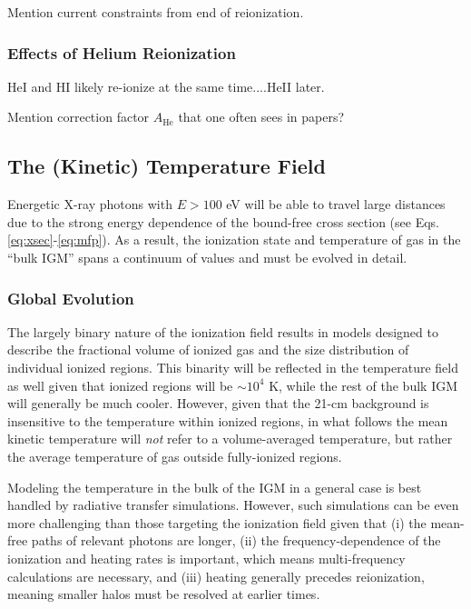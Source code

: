 Mention current constraints from end of reionization.


\subsubsection{Effects of Helium Reionization}
HeI and HI likely re-ionize at the same time....HeII later.

Mention correction factor $A_{\mathrm{He}}$ that one often sees in papers?

\subsection{The (Kinetic) Temperature Field}
Energetic X-ray photons with $E > 100$ eV will be able to travel large distances due to the strong energy dependence of the bound-free cross section (see Eqs. \ref{eq:xsec}-\ref{eq:mfp}). As a result, the ionization state and temperature of gas in the ``bulk IGM'' spans a continuum of values and must be evolved in detail. 

\subsubsection{Global Evolution} \label{sec:temperature_global}
The largely binary nature of the ionization field results in models designed to describe the fractional volume of ionized gas and the size distribution of individual ionized regions. This binarity will be reflected in the temperature field as well given that ionized regions will be $\sim 10^4$ K, while the rest of the bulk IGM will generally be much cooler. However, given that the 21-cm background is insensitive to the temperature within ionized regions, in what follows the mean kinetic temperature will \textit{not} refer to a volume-averaged temperature, but rather the average temperature of gas outside fully-ionized regions. 

Modeling the temperature in the bulk of the IGM in a general case is best handled by radiative transfer simulations. However, such simulations can be even more challenging than those targeting the ionization field given that (i) the mean-free paths of relevant photons are longer, (ii) the frequency-dependence of the ionization and heating rates is important, which means multi-frequency calculations are necessary, and (iii) heating generally precedes reionization, meaning smaller halos must be resolved at earlier times. 

